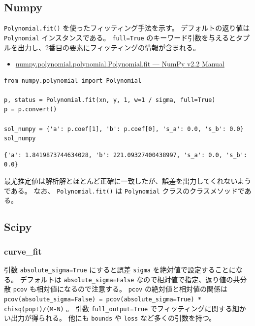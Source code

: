 \documentclass[a4paper, 9pt, notitlepage, uplatex, dvipdfmx]{jsarticle}
\begin{document}
\subsection{Numpy}
\label{sec:org1305aa8}
\texttt{Polynomial.fit()} を使ったフィッティング手法を示す。
デフォルトの返り値は \texttt{Polynomial} インスタンスである。
\texttt{full=True} のキーワード引数を与えるとタプルを出力し、2番目の要素にフィッティングの情報が含まれる。
\begin{itemize}
\item \href{https://numpy.org/doc/stable/reference/generated/numpy.polynomial.polynomial.Polynomial.fit.html\#numpy.polynomial.polynomial.Polynomial.fit}{numpy.polynomial.polynomial.Polynomial.fit — NumPy v2.2 Manual}
\end{itemize}
\begin{verbatim}
from numpy.polynomial import Polynomial

p, status = Polynomial.fit(xn, y, 1, w=1 / sigma, full=True)
p = p.convert()

sol_numpy = {'a': p.coef[1], 'b': p.coef[0], 's_a': 0.0, 's_b': 0.0}
sol_numpy
\end{verbatim}

\label{}
\begin{verbatim}
{'a': 1.8419873744634028, 'b': 221.09327400438997, 's_a': 0.0, 's_b': 0.0}
\end{verbatim}

最尤推定値は解析解とほとんど正確に一致したが、誤差を出力してくれないようである。
なお、 \texttt{Polynomial.fit()} は \texttt{Polynomial} クラスのクラスメソッドである。
\subsection{Scipy}
\label{sec:org52cb7e7}
\subsubsection{curve\_fit}
\label{sec:org986d1b1}
引数 \texttt{absolute\_sigma=True} にすると誤差 \texttt{sigma} を絶対値で設定することになる。
デフォルトは \texttt{absolute\_sigma=False} なので相対値で指定、返り値の共分散 \texttt{pcov} も相対値になるので注意する。
\texttt{pcov} の絶対値と相対値の関係は \texttt{pcov(absolute\_sigma=False) = pcov(absolute\_sigma=True) * chisq(popt)/(M-N)} 。
引数 \texttt{full\_output=True} でフィッティングに関する細かい出力が得られる。
他にも \texttt{bounds} や \texttt{loss} など多くの引数を持つ。
\end{document}
